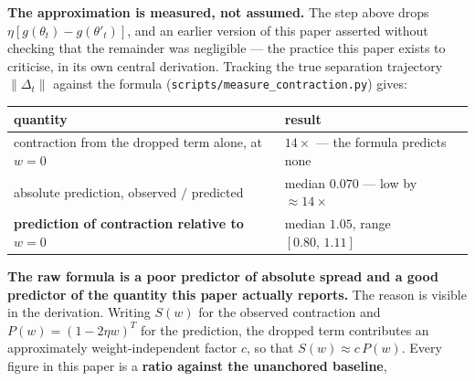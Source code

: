 \textbf{The approximation is measured, not assumed.} The step above drops
\(\eta[g(\theta_t) - g(\theta'_t)]\), and an earlier version of this paper asserted without
checking that the remainder was negligible --- the practice this paper exists to criticise, in its
own central derivation. Tracking the true separation trajectory
\(\lVert \Delta_t \rVert\) against the formula (\texttt{scripts/measure\_contraction.py}) gives:

\begin{longtable}[]{@{}ll@{}}
\toprule
\begin{minipage}[b]{0.47\columnwidth}\raggedright
quantity\strut
\end{minipage} & \begin{minipage}[b]{0.47\columnwidth}\raggedright
result\strut
\end{minipage}\tabularnewline
\midrule
\endhead
\begin{minipage}[t]{0.47\columnwidth}\raggedright
contraction from the dropped term alone, at \(w = 0\)\strut
\end{minipage} & \begin{minipage}[t]{0.47\columnwidth}\raggedright
\(14\times\) --- the formula predicts none\strut
\end{minipage}\tabularnewline
\begin{minipage}[t]{0.47\columnwidth}\raggedright
absolute prediction, observed \(/\) predicted\strut
\end{minipage} & \begin{minipage}[t]{0.47\columnwidth}\raggedright
median \(0.070\) --- low by \(\approx 14\times\)\strut
\end{minipage}\tabularnewline
\begin{minipage}[t]{0.47\columnwidth}\raggedright
\textbf{prediction of contraction relative to \(w = 0\)}\strut
\end{minipage} & \begin{minipage}[t]{0.47\columnwidth}\raggedright
median \(1.05\), range \([0.80,\, 1.11]\)\strut
\end{minipage}\tabularnewline
\bottomrule
\end{longtable}

\textbf{The raw formula is a poor predictor of absolute spread and a good predictor of the quantity
this paper actually reports.} The reason is visible in the derivation. Writing \(S(w)\) for the
observed contraction and \(P(w) = (1-2\eta w)^T\) for the prediction, the dropped term contributes
an approximately weight-independent factor \(c\), so that \(S(w) \approx c\,P(w)\). Every figure in
this paper is a \textbf{ratio against the unanchored baseline},

